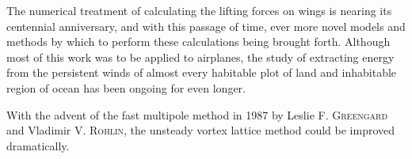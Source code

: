 The numerical treatment of calculating the lifting forces on wings is nearing its centennial anniversary, and with this passage of time, ever more novel models and methods by which to perform these calculations being brought forth.
Although most of this work was to be applied to airplanes, the study of extracting energy from the persistent winds of almost every habitable plot of land and inhabitable region of ocean has been ongoing for even longer. 

With the advent of the fast multipole method in 1987 by Leslie F. \textsc{Greengard} and Vladimir V. \textsc{Rohlin}, the unsteady vortex lattice method could be improved dramatically.
